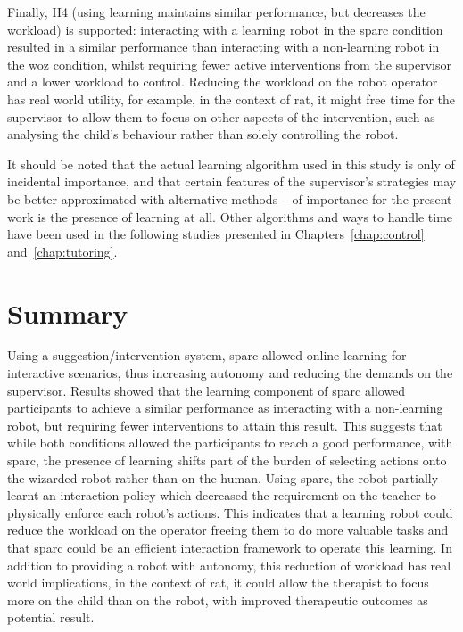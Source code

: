 Finally, H4 (using learning maintains similar performance, but decreases the workload) is supported: interacting with a learning robot in the \gls{sparc} condition resulted in a similar performance than interacting with a non-learning robot in the \gls{woz} condition, whilst requiring fewer active interventions from the supervisor and a lower workload to control. Reducing the workload on the robot operator has real world utility, for example, in the context of \gls{rat}, it might free time for the supervisor to allow them to focus on other aspects of the intervention, such as analysing the child's behaviour rather than solely controlling the robot. 

It should be noted that the actual learning algorithm used in this study is only of incidental importance, and that certain features of the supervisor's strategies may be better approximated with alternative methods -- of importance for the present work is the presence of learning at all. Other algorithms and ways to handle time have been used in the following studies presented in Chapters~\ref{chap:control} and~\ref{chap:tutoring}.

\section{Summary}

Using a suggestion/intervention system, \gls{sparc} allowed online learning for interactive scenarios, thus increasing autonomy and reducing the demands on the supervisor. Results showed that the learning component of \gls{sparc} allowed participants to achieve a similar performance as interacting with a non-learning robot, but requiring fewer interventions to attain this result. This suggests that while both conditions allowed the participants to reach a good performance, with \gls{sparc}, the presence of learning shifts part of the burden of selecting actions onto the wizarded-robot rather than on the human. Using \gls{sparc}, the robot partially learnt an interaction policy which decreased the requirement on the teacher to physically enforce each robot's actions. This indicates that a learning robot could reduce the workload on the operator freeing them to do more valuable tasks and that \gls{sparc} could be an efficient interaction framework to operate this learning. In addition to providing a robot with autonomy, this reduction of workload has real world implications, in the context of \gls{rat}, it could allow the therapist to focus more on the child than on the robot, with improved therapeutic outcomes as potential result. 

